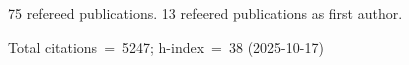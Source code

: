 75 refereed publications. 13 refeered publications as first author.

Total citations~=~5247; h-index~=~38 (2025-10-17)